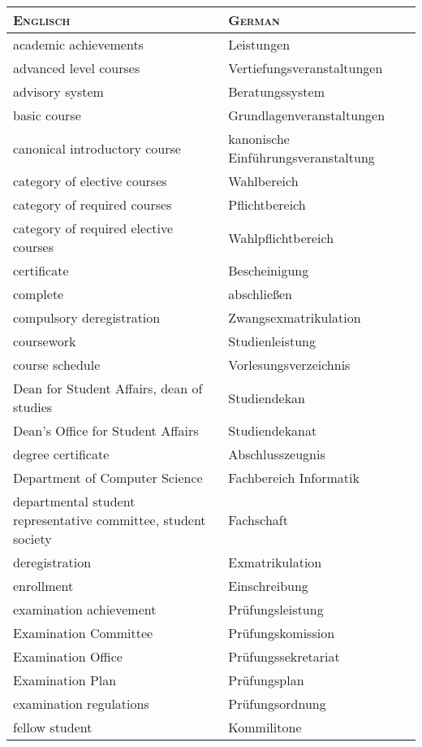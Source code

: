 \begin{longtable} {|p{.5\linewidth}|p{.5\linewidth}|}
\hline
\textsc{Englisch} & \textsc{German}\\
\hline
\hline
academic achievements & Leistungen \\
\hline
advanced level courses & Vertiefungsveranstaltungen \\
\hline
advisory system & Beratungssystem \\
\hline
basic course & Grundlagenveranstaltungen \\
\hline
canonical introductory course & kanonische Einführungsveranstaltung \\
\hline
category of elective courses & Wahlbereich \\
\hline
category of required courses & Pflichtbereich \\
\hline
category of required elective courses & Wahlpflichtbereich \\
\hline
certificate & Bescheinigung \\
\hline
complete & abschließen\\
\hline
compulsory deregistration & Zwangsexmatrikulation \\
\hline
coursework & Studienleistung \\
\hline
course schedule & Vorlesungsverzeichnis \\
\hline
Dean for Student Affairs, dean of studies & Studiendekan \\
\hline
Dean's Office for Student Affairs & Studiendekanat \\
\hline
degree certificate & Abschlusszeugnis \\
\hline
Department of Computer Science & Fachbereich Informatik \\
\hline
departmental student representative committee, student society & Fachschaft \\
\hline
deregistration & Exmatrikulation \\
\hline
enrollment & Einschreibung \\
\hline
examination achievement & Prüfungsleistung \\
\hline
Examination Committee & Prüfungskomission \\
\hline
Examination Office & Prüfungssekretariat \\
\hline
Examination Plan & Prüfungsplan \\
\hline
examination regulations & Prüfungsordnung \\
\hline
fellow student & Kommilitone \\

\end{longtable}
